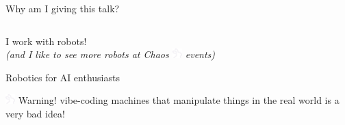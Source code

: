 \documentclass[aspectratio=169]{beamer}
\begin{document}
\begin{frame}{Why am I giving this talk?}
\begin{columns}
        \end{columns}
        \vspace{1.5em}
        I work with robots!\\
        \textit{(and I like to see more robots at Chaos \includegraphics[height=1em]{figures/hare_head_darkmode.pdf} events)}
\end{frame}


\begin{frame}{Robotics for AI enthusiasts}
    \centering
    \begin{minipage}{0.6\textwidth}
        \begin{alertblock}{\includegraphics[height=1em]{figures/hare_head_darkmode.pdf} Warning!}
            vibe-coding machines that manipulate things in the real world is a very bad idea!
        \end{alertblock}
\end{minipage}
\end{frame}
\end{document}
